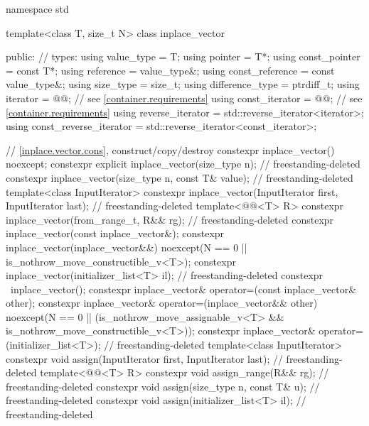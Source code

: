 \begin{codeblock}
namespace std {
  template<class T, size_t N>
  class inplace_vector {
  public:
    // types:
    using value_type             = T;
    using pointer                = T*;
    using const_pointer          = const T*;
    using reference              = value_type&;
    using const_reference        = const value_type&;
    using size_type              = size_t;
    using difference_type        = ptrdiff_t;
    using iterator               = @@; // see \ref{container.requirements}
    using const_iterator         = @@; // see \ref{container.requirements}
    using reverse_iterator       = std::reverse_iterator<iterator>;
    using const_reverse_iterator = std::reverse_iterator<const_iterator>;

    // \ref{inplace.vector.cons}, construct/copy/destroy
    constexpr inplace_vector() noexcept;
    constexpr explicit inplace_vector(size_type n);                         // freestanding-deleted
    constexpr inplace_vector(size_type n, const T& value);                  // freestanding-deleted
    template<class InputIterator>
      constexpr inplace_vector(InputIterator first, InputIterator last);    // freestanding-deleted
    template<@@<T> R>
      constexpr inplace_vector(from_range_t, R&& rg);                       // freestanding-deleted
    constexpr inplace_vector(const inplace_vector&);
    constexpr inplace_vector(inplace_vector&&)
      noexcept(N == 0 || is_nothrow_move_constructible_v<T>);
    constexpr inplace_vector(initializer_list<T> il);                       // freestanding-deleted
    constexpr ~inplace_vector();
    constexpr inplace_vector& operator=(const inplace_vector& other);
    constexpr inplace_vector& operator=(inplace_vector&& other)
      noexcept(N == 0 || (is_nothrow_move_assignable_v<T> &&
                          is_nothrow_move_constructible_v<T>));
    constexpr inplace_vector& operator=(initializer_list<T>);               // freestanding-deleted
    template<class InputIterator>
      constexpr void assign(InputIterator first, InputIterator last);       // freestanding-deleted
    template<@@<T> R>
      constexpr void assign_range(R&& rg);                                  // freestanding-deleted
    constexpr void assign(size_type n, const T& u);                         // freestanding-deleted
    constexpr void assign(initializer_list<T> il);                          // freestanding-deleted

}}
\end{codeblock}
